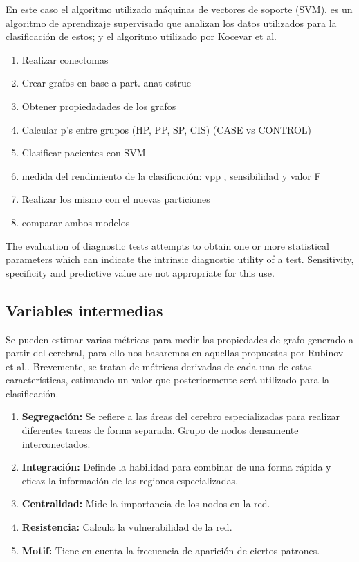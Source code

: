 \documentclass[fleqn,12pt]{UICArticle} %
\begin{document}
En este caso el algoritmo utilizado máquinas de vectores de soporte (SVM), es un algoritmo de aprendizaje supervisado que analizan los datos utilizados para la clasificación de estos; y el algoritmo utilizado por Kocevar et al.\cite{Kocevar2016}


\begin{enumerate}[noitemsep]
\item Realizar conectomas
\item Crear grafos en base a part. anat-estruc
\item Obtener propiedadades de los grafos
\item Calcular p's entre grupos (HP, PP, SP, CIS) (CASE vs CONTROL) %
\item Clasificar pacientes con SVM
\item medida del rendimiento de la clasificación: vpp , sensibilidad y valor F
\item Realizar los mismo con el nuevas particiones
\item comparar ambos modelos
\end{enumerate}


The evaluation of diagnostic tests attempts to obtain one or more statistical parameters which can indicate the intrinsic diagnostic utility of a test. Sensitivity, specificity and predictive value are not appropriate for this use\cite{Birkett1988}.


\subsection{Variables intermedias}
Se pueden estimar varias métricas para medir las propiedades de grafo generado a partir del cerebral, para ello nos basaremos en aquellas propuestas por Rubinov et al.\cite{Rubinov2010}. Brevemente, se tratan de métricas derivadas de cada una de estas características, estimando un valor que posteriormente será utilizado para la clasificación.

\begin{enumerate}[noitemsep]
\item \textbf{Segregación:} Se refiere a las áreas del cerebro especializadas para realizar diferentes tareas de forma separada. Grupo de nodos densamente interconectados.
\item \textbf{Integración:} Definde la habilidad para combinar de una forma rápida y eficaz la información de las regiones especializadas.
\item \textbf{Centralidad:} Mide la importancia de los nodos en la red.
\item \textbf{Resistencia:} Calcula la vulnerabilidad de la red.
\item \textbf{Motif:} Tiene en cuenta la frecuencia de aparición de ciertos patrones.
\end{enumerate}
\end{document}

